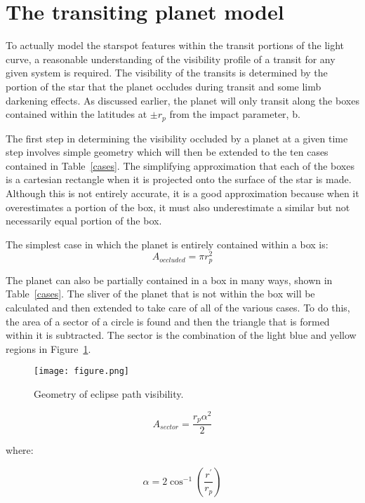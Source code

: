 \documentclass[iop]{emulateapj}
\begin{document}
\vspace{9mm}
\section{The transiting planet model \label{transit_model}}
To actually model the starspot features within the transit portions of the light curve, a reasonable understanding of the visibility profile of a transit for any given system is required. The visibility of the transits is determined by the portion of the star that the planet occludes during transit and some limb darkening effects. As discussed earlier, the planet will only transit along the boxes contained within the latitudes at $\pm r_p$ from the impact parameter, b. 
 
The first step in determining the visibility occluded by a planet at a given time step involves simple geometry which will then be extended to the ten cases contained in Table~\ref{cases}. The simplifying approximation that each of the boxes is a cartesian rectangle when it is projected onto the surface of the star is made. Although this is not entirely accurate, it is a good approximation because when it overestimates a portion of the box, it must also underestimate a similar but not necessarily equal portion of the box.

The simplest case in which the planet is entirely contained within a box is:
\begin{equation}
	A_{occluded} = \pi r_p^2
\end{equation}

The planet can also be partially contained in a box in many ways, shown in Table~\ref{cases}. The sliver of the planet that is not within the box will be calculated and then extended to take care of all of the various cases. To do this, the area of a sector of a circle is found and then the triangle that is formed within it is subtracted. The sector is the combination of the light blue and yellow regions in Figure~\ref{eclipse}.
\begin{figure}[h]
	\centering
	\texttt{[image: figure.png]}
	\caption{Geometry of eclipse path visibility.}
	\label{eclipse}
\end{figure}

\begin{equation}
	A_{sector} = \frac{r_p \alpha^2}{2}
\end{equation}

where:

\begin{equation}
	\alpha = 2 \cos^{-1}\left(\frac{r^{\prime}}{r_p}\right)
\end{equation}
\end{document}
